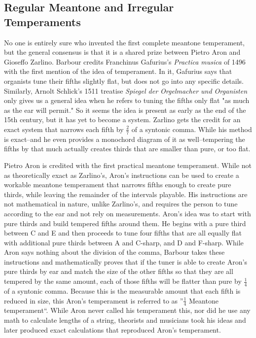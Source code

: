 \subsection{Regular Meantone and Irregular Temperaments}

No one is entirely sure who invented the first complete meantone temperament,
but the general consensus is that it is a shared prize between Pietro Aron and
Gioseffo Zarlino.  Barbour credits Franchinus Gafurius's \textit{Practica
musica} of 1496 with the first mention of the idea of temperament.  In it,
Gafurius says that organists tune their fifths slightly flat, but does not go
into any specific details.\autocite[25]{MB:1}  Similarly, Arnolt Schlick's 1511
treatise \textit{Spiegel der Orgelmacher und Organisten} only gives us a general
idea when he refers to tuning the fifths only flat "as much as the ear will
permit." \autocite[202]{RR:1}  So it seems the idea is present as early as the
end of the 15th century, but it has yet to become a system.  Zarlino
gets the credit for an exact system that narrows each fifth by $\frac{2}{7}$ of a syntonic
comma.  While his method is exact--and he even provides a monochord diagram
of it as well--tempering the fifths by that much actually creates thirds that
are smaller than pure, or too flat.

Pietro Aron is credited with the first practical meantone temperament.  While
not as theoretically exact as Zarlino's, Aron's instructions can be used to
create a workable meantone temperament that narrows fifths enough to create pure thirds, while
leaving the remainder of the intervals playable.  His instructions are not mathematical in
nature, unlike Zarlino's, and requires the person to tune according to the
ear and not rely on measurements.  Aron's idea was to start with pure thirds and build
tempered fifths around them.  He begins with a pure third between C and E
and then proceeds to tune four fifths that are all equally flat with additional pure thirds
between A and C-sharp, and D and F-sharp.  While Aron says nothing about the division of
the comma, Barbour takes these instructions and mathematically proves that
if the tuner is able to create Aron's pure thirds by ear and match the size
of the other fifths so that they are all tempered by the same amount, each
of those fifths will be flatter than pure by $ \frac{1}{4} $ of a syntonic
comma.\autocite[27]{MB:1}  Because this is the measurable amount that each fifth is reduced
in size, this Aron's temperament is referred to as ''$ \frac{1}{4} $ Meantone temperament``.
While Aron never called his temperament this, nor did he use any math to calculate lengths of
a string, theorists and musicians took his ideas and later produced exact calculations that
reproduced Aron's temperament.

